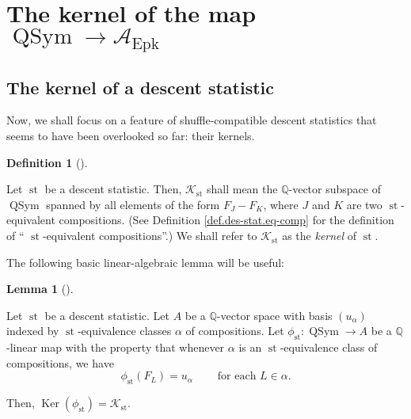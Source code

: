 \documentclass[numbers=enddot,12pt,final,onecolumn,notitlepage]{scrartcl}%
\theoremstyle{definition}
\newtheorem{lem}[theo]{Lemma}
\newenvironment{lemma}[1][]
{\begin{lem}[#1]\begin{leftbar}}
{\end{leftbar}\end{lem}}
\newtheorem{defi}[theo]{Definition}
\newenvironment{definition}[1][]
{\begin{defi}[#1]\begin{leftbar}}
{\end{leftbar}\end{defi}}
\begin{document}
\section{\label{sect.kernel}The kernel of the map $\operatorname*{QSym}%
\rightarrow\mathcal{A}_{\operatorname*{Epk}}$}

\subsection{The kernel of a descent statistic}

Now, we shall focus on a feature of shuffle-compatible descent statistics that
seems to have been overlooked so far: their kernels.

\begin{definition}
Let $\operatorname*{st}$ be a descent statistic. Then, $\mathcal{K}%
_{\operatorname*{st}}$ shall mean the $\mathbb{Q}$-vector subspace of
$\operatorname*{QSym}$ spanned by all elements of the form $F_{J}-F_{K}$,
where $J$ and $K$ are two $\operatorname*{st}$-equivalent compositions. (See
Definition \ref{def.des-stat.eq-comp} for the definition of \textquotedblleft%
$\operatorname*{st}$-equivalent compositions\textquotedblright.) We shall
refer to $\mathcal{K}_{\operatorname*{st}}$ as the \textit{kernel} of
$\operatorname*{st}$.
\end{definition}

The following basic linear-algebraic lemma will be useful:

\begin{lemma}
\label{lem.K.fist}Let $\operatorname*{st}$ be a descent statistic. Let $A$ be
a $\mathbb{Q}$-vector space with basis $\left(  u_{\alpha}\right)  $ indexed
by $\operatorname*{st}$-equivalence classes $\alpha$ of compositions. Let
$\phi_{\operatorname*{st}}:\operatorname*{QSym}\rightarrow A$ be a
$\mathbb{Q}$-linear map with the property that whenever $\alpha$ is an
$\operatorname*{st}$-equivalence class of compositions, we have%
\begin{equation}
\phi_{\operatorname*{st}}\left(  F_{L}\right)  =u_{\alpha}%
\ \ \ \ \ \ \ \ \ \ \text{for each }L\in\alpha. \label{pf.prop.K.ideal.dir1.1}%
\end{equation}


Then, $\operatorname*{Ker}\left(  \phi_{\operatorname*{st}}\right)
=\mathcal{K}_{\operatorname*{st}}$.
\end{lemma}
\end{document}
